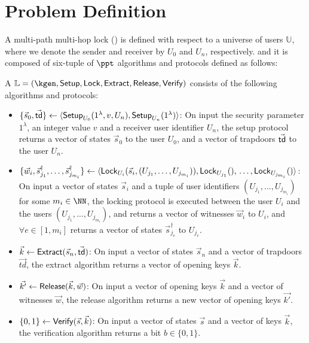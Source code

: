 \section{Problem Definition}


A multi-path multi-hop lock (\sysname) is defined with respect to a universe of users $\mathbb{U}$, where we 
denote the sender and receiver by $U_0$ and $U_n$, respectively. and it is composed of six-tuple of $\ppt$ 
algorithms and protocols defined as follows:

\begin{definition}
A \sysname $\mathbb{L} = (\kgen, \Setup, \Lock, \Extract, \Release,\\ \Verify)$ consists of the 
following algorithms and protocols:

\begin{itemize}[leftmargin=15pt] %
	\item $\{\vec{s}_0, \vec{\mathsf{td}}\} \gets \langle \mathsf{Setup}_{U_0}(1^\lambda, v, U_n),\mathsf{Setup}_{U_n}(1^\lambda) 
	\rangle$: On input the security parameter $1^\lambda$, an integer value $v$ and a receiver user identifier 
	$U_n$, the setup protocol returns a vector of states $\vec{s}_0$ to the user $U_0$, and a vector 
	of trapdoors $\vec{\mathsf{td}}$ to the user $U_n$.
	
	\item $\{\vec{w}_i,\vec{s}_{j_1}^\dag,\ldots,\vec{s}_{j_{m_i}}^\dag\} \gets \langle 
	\mathsf{Lock}_{U_i}(\vec{s}_i, (U_{j_1},\ldots,U_{j_{m_i}})), \mathsf{Lock}_{U_{j_1}}(),\\ \ldots, \mathsf{Lock}_{U_{j_{m_i}}}() 
	\rangle$: On input a vector of states $\vec{s}_i$ and a tuple of user identifiers $(U_{j_1},\ldots,
	U_{j_{m_i}})$ for some $m_i \in \NN$, the locking protocol is executed between the user $U_i$ and the users 
	$(U_{j_1},\ldots,U_{j_{m_i}})$, and returns a vector of witnesses $\vec{w}_i$ to $U_i$, and $\forall e 
	\in [1,m_i]$ returns a vector of states $\vec{s}_{j_e}^\dag$ to $U_{j_e}$.
	
	\item $\vec{k} \gets \mathsf{Extract}(\vec{s}_n,\vec{\mathsf{td}})$: On input a vector of states $\vec{s}_n$ and a 
	vector of trapdoors $\vec{td}$, the extract algorithm returns a vector of opening keys $\vec{k}$.
	
	\item $\vec{k'} \gets \mathsf{Release}(\vec{k},\vec{w})$: On input a vector of opening keys $\vec{k}$ and a 
	vector of witnesses $\vec{w}$, the release algorithm returns a new vector of opening keys $\vec{k'}$.
	
	\item $\{0,1\} \gets \mathsf{Verify}(\vec{s}, \vec{k})$: On input a vector of states $\vec{s}$ and a vector 
	of keys $\vec{k}$, the verification algorithm returns a bit $b \in \{0,1\}$.
\end{itemize}
\end{definition}

